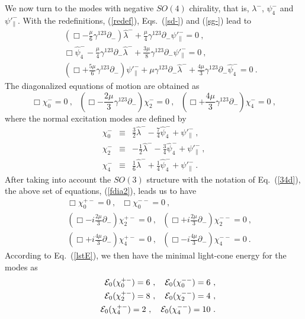 \documentclass[a4paper,12pt]{article}
\numberwithin{equation}{section}
\begin{document}
We now turn to the modes with negative $SO(4)$ chirality, that is,
$\lambda^-$, $\psi^-_4$ and $\psi'^-_\|$.  With the redefinitions,
(\ref{redef}), Eqs.~(\ref{sd-}) and (\ref{sg-}) lead to
\begin{eqnarray}
& & ( \Box - \frac{\mu}{6} \gamma^{123} \partial_- )
   \hat{\lambda}^-
   + \frac{\mu}{4} \gamma^{123} \partial_- \psi'^-_\| = 0 ~,
            \nonumber \\
& & \Box \hat{\psi}^-_4
   - \frac{\mu}{4} \gamma^{123} \partial_- \hat{\lambda}^-
   + \frac{3\mu}{8} \gamma^{123} \partial_- \psi'^-_\| = 0 ~,
            \nonumber \\
& & ( \Box + \frac{5\mu}{6} \gamma^{123} \partial_- )
   \psi'^-_\|
   + \mu \gamma^{123} \partial_- \hat{\lambda}^-
   + \frac{4\mu}{3} \gamma^{123} \partial_- \hat{\psi}^-_4 = 0 ~.
\end{eqnarray}
The diagonalized equations of motion are obtained as
\begin{equation}
\Box \chi^-_0 = 0 ~,~~~
( \Box - \frac{2 \mu}{3} \gamma^{123} \partial_- )
     \chi^-_2 = 0 ~,~~~
( \Box + \frac{4 \mu}{3} \gamma^{123} \partial_- )
     \chi^-_4 = 0 ~,
\label{fdia2}
\end{equation}
where the normal excitation modes are defined by
\begin{eqnarray}
\chi^-_0 & \equiv &
      \frac{3}{2} \hat{\lambda}^-
     - \frac{7}{4} \hat{\psi}^-_4 + \psi'^-_\| ~,
          \nonumber \\
\chi^-_2 & \equiv &
     -\frac{1}{2} \hat{\lambda}^-
     - \frac{3}{4} \hat{\psi}^-_4 + \psi'^-_\| ~,
          \nonumber \\
\chi^-_4 & \equiv &
      \frac{1}{6} \hat{\lambda}^-
     + \frac{1}{4} \hat{\psi}^-_4 + \psi'^-_\| ~.
\end{eqnarray}
After taking into account the $SO(3)$ structure with the notation of
Eq.~(\ref{34d}), the above set of equations, (\ref{fdia2}), leads us to
have
\begin{eqnarray}
& & \Box \chi^{+-}_0 = 0 ~,~~~
    \Box \chi^{--}_0 = 0 ~,
 \nonumber \\
& & ( \Box - i \frac{2 \mu}{3} \partial_- )
         \chi^{+-}_2 = 0 ~,~~~
    ( \Box + i \frac{2 \mu}{3} \partial_- )
         \chi^{--}_2 = 0 ~,~
 \nonumber \\
& & ( \Box + i \frac{4 \mu}{3} \partial_- )
         \chi^{+-}_4 = 0 ~,~~~
    ( \Box - i \frac{4 \mu}{3} \partial_- )
         \chi^{--}_4 = 0 ~.
\end{eqnarray}
According to Eq.~(\ref{lstE}), we then have the minimal light-cone
energy for the modes as
\begin{eqnarray}
& & {\cal E}_0 (\chi^{+-}_0) = 6 ~,~~~
    {\cal E}_0 (\chi^{--}_0) = 6 ~,
 \nonumber \\
& & {\cal E}_0 (\chi^{+-}_2) = 8 ~,~~~
    {\cal E}_0 (\chi^{--}_2) = 4 ~,
 \nonumber \\
& & {\cal E}_0 (\chi^{+-}_4) = 2 ~,~~~
    {\cal E}_0 (\chi^{--}_4) = 10 ~.
\end{eqnarray}
\end{document}
